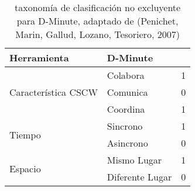 \begin{table}[]
\caption{ taxonomía de clasificación no excluyente para D-Minute, adaptado de  (Penichet, Marin, Gallud, Lozano,  Tesoriero, 2007)}
\label{my-label}
\begin{tabular}{@{}lll@{}}
\toprule
Herramienta & \multicolumn{2}{l}{D-Minute} \\ \midrule
\multicolumn{1}{|c|}{\multirow{3}{*}{Característica CSCW}} & \multicolumn{1}{l|}{Colabora} & \multicolumn{1}{l|}{1} \\ \cmidrule(l){2-3} 
\multicolumn{1}{|c|}{} & \multicolumn{1}{l|}{Comunica} & \multicolumn{1}{l|}{0} \\ \cmidrule(l){2-3} 
\multicolumn{1}{|c|}{} & \multicolumn{1}{l|}{Coordina} & \multicolumn{1}{l|}{1} \\ \midrule
\multicolumn{1}{|l|}{\multirow{2}{*}{Tiempo}} & \multicolumn{1}{l|}{Sincrono} & \multicolumn{1}{l|}{1} \\ \cmidrule(l){2-3} 
\multicolumn{1}{|l|}{} & \multicolumn{1}{l|}{Asincrono} & \multicolumn{1}{l|}{0} \\ \midrule
\multicolumn{1}{|l|}{\multirow{2}{*}{Espacio}} & \multicolumn{1}{l|}{Mismo Lugar} & \multicolumn{1}{l|}{1} \\ \cmidrule(l){2-3} 
\multicolumn{1}{|l|}{} & Diferente Lugar & 0 \\ \bottomrule
\end{tabular}
\end{table}